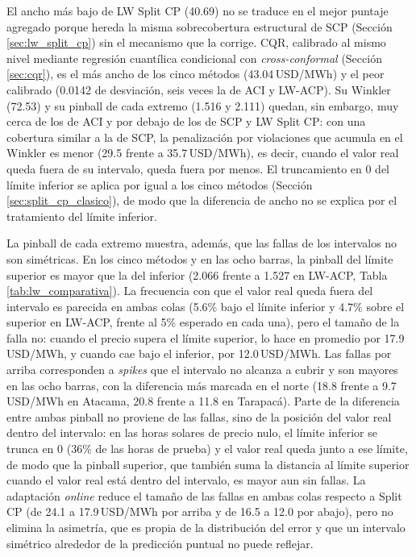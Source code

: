 El ancho más bajo de LW Split CP (40.69) no se traduce en el mejor puntaje agregado porque hereda la misma sobrecobertura estructural de SCP (Sección \ref{sec:lw_split_cp}) sin el mecanismo que la corrige. CQR, calibrado al mismo nivel mediante regresión cuantílica condicional con \textit{cross-conformal} (Sección \ref{sec:cqr}), es el más ancho de los cinco métodos (43.04\,USD/MWh) y el peor calibrado (0.0142 de desviación, seis veces la de ACI y LW-ACP). Su Winkler (72.53) y su pinball de cada extremo (1.516 y 2.111) quedan, sin embargo, muy cerca de los de ACI y por debajo de los de SCP y LW Split CP: con una cobertura similar a la de SCP, la penalización por violaciones que acumula en el Winkler es menor (29.5 frente a 35.7\,USD/MWh), es decir, cuando el valor real queda fuera de su intervalo, queda fuera por menos. El truncamiento en 0 del límite inferior se aplica por igual a los cinco métodos (Sección \ref{sec:split_cp_clasico}), de modo que la diferencia de ancho no se explica por el tratamiento del límite inferior.

La pinball de cada extremo muestra, además, que las fallas de los intervalos no son simétricas. En los cinco métodos y en las ocho barras, la pinball del límite superior es mayor que la del inferior (2.066 frente a 1.527 en LW-ACP, Tabla \ref{tab:lw_comparativa}). La frecuencia con que el valor real queda fuera del intervalo es parecida en ambas colas (5.6\% bajo el límite inferior y 4.7\% sobre el superior en LW-ACP, frente al 5\% esperado en cada una), pero el tamaño de la falla no: cuando el precio supera el límite superior, lo hace en promedio por 17.9\,USD/MWh, y cuando cae bajo el inferior, por 12.0\,USD/MWh. Las fallas por arriba corresponden a \textit{spikes} que el intervalo no alcanza a cubrir y son mayores en las ocho barras, con la diferencia más marcada en el norte (18.8 frente a 9.7\,USD/MWh en Atacama, 20.8 frente a 11.8 en Tarapacá). Parte de la diferencia entre ambas pinball no proviene de las fallas, sino de la posición del valor real dentro del intervalo: en las horas solares de precio nulo, el límite inferior se trunca en 0 (36\% de las horas de prueba) y el valor real queda junto a ese límite, de modo que la pinball superior, que también suma la distancia al límite superior cuando el valor real está dentro del intervalo, es mayor aun sin fallas. La adaptación \textit{online} reduce el tamaño de las fallas en ambas colas respecto a Split CP (de 24.1 a 17.9\,USD/MWh por arriba y de 16.5 a 12.0 por abajo), pero no elimina la asimetría, que es propia de la distribución del error y que un intervalo simétrico alrededor de la predicción puntual no puede reflejar.

